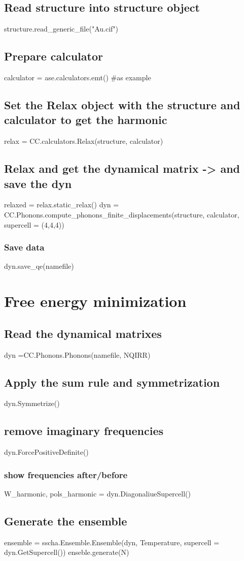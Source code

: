 \documentclass[]{report}
\begin{document}
\subsection{Read structure into structure object}
structure.read\_generic\_file("Au.cif")
\subsection{Prepare calculator}
calculator = ase.calculators.emt() \#as example
\subsection{Set the Relax object with the structure and calculator to get the harmonic}
relax = CC.calculators.Relax(structure, calculator)
\subsection{Relax and get the dynamical matrix -> and save the dyn}
relaxed = relax.static\_relax()
dyn = CC.Phonons.compute\_phonons\_finite\_displacements(structure, calculator, supercell = (4,4,4))
\subsubsection{Save data}
dyn.save\_qe(namefile)
\section{Free energy minimization}

\subsection{Read the dynamical matrixes}
dyn =CC.Phonons.Phonons(namefile, NQIRR)
\subsection{Apply the sum rule and symmetrization}
dyn.Symmetrize()
\subsection{remove imaginary frequencies}
dyn.ForcePositiveDefinite()
\subsubsection{show frequencies after/before}
W\_harmonic, pols\_harmonic = dyn.DiagonaliueSupercell()
\subsection{Generate the ensemble}
ensemble = sscha.Ensemble.Ensemble(dyn, Temperature, supercell = dyn.GetSupercell())
enseble.generate(N)
\end{document}

